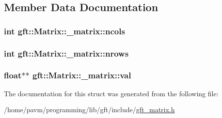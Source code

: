 \subsection{Member Data Documentation}
\hypertarget{structgft_1_1Matrix_1_1__matrix_a4b61985e3d0ec2950798d37bfcec916a}{
\subsubsection[{ncols}]{\setlength{\rightskip}{0pt plus 5cm}int gft\-::\-Matrix\-::\-\_\-matrix\-::ncols}}\label{structgft_1_1Matrix_1_1__matrix_a4b61985e3d0ec2950798d37bfcec916a}
\hypertarget{structgft_1_1Matrix_1_1__matrix_a0c4817339b3dd2b842cb2fd66df70bcc}{
\subsubsection[{nrows}]{\setlength{\rightskip}{0pt plus 5cm}int gft\-::\-Matrix\-::\-\_\-matrix\-::nrows}}\label{structgft_1_1Matrix_1_1__matrix_a0c4817339b3dd2b842cb2fd66df70bcc}
\hypertarget{structgft_1_1Matrix_1_1__matrix_a8df72738edce4750dd107aa59c7c22eb}{
\subsubsection[{val}]{\setlength{\rightskip}{0pt plus 5cm}float$\ast$$\ast$ gft\-::\-Matrix\-::\-\_\-matrix\-::val}}\label{structgft_1_1Matrix_1_1__matrix_a8df72738edce4750dd107aa59c7c22eb}


The documentation for this struct was generated from the following file\-:\begin{DoxyCompactItemize}
\item 
/home/pavm/programming/lib/gft/include/\hyperlink{gft__matrix_8h}{gft\-\_\-matrix.\-h}\end{DoxyCompactItemize}
